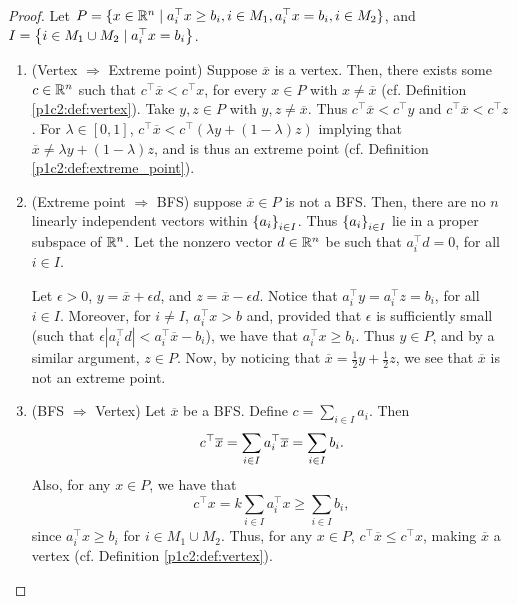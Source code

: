 \begin{proof}
	Let $P =\{ x \in \mathbb{R}^n \mid a_i^\top x \geq b_i, i \in M_1, a_i^\top x = b_i, i \in M_2\}$, and $I = \left\{ i \in M_1 \cup M_2 \mid a_i^\top x = b_i \right \}$.
	
	\begin{enumerate}
		\item (Vertex $\Rightarrow$ Extreme point) Suppose $\overline{x}$ is a vertex. Then, there exists some $c \in \mathbb{R}^n$ such that $c^\top\overline{x} < c^\top x$, for every $x \in P$ with $x \neq \overline{x}$ (cf. Definition \ref{p1c2:def:vertex}). Take $y,z \in P$ with $y,z \neq \overline{x}$. Thus $c^\top\overline{x} < c^\top y$ and $c^\top\overline{x} < c^\top z$. For $\lambda \in [0,1]$, $c^\top \overline{x} < c^\top(\lambda y + (1-\lambda)z)$ implying that $\overline{x} \neq \lambda y + (1-\lambda)z$, and is thus an extreme point (cf. Definition \ref{p1c2:def:extreme_point}).
		
		\item (Extreme point $\Rightarrow$ BFS) suppose $\overline{x} \in P$ is not a BFS. Then, there are no $n$ linearly independent vectors within $\left\{ a_i \right \}_{i \in I}$. Thus $\left\{ a_i \right \}_{i \in I}$ lie in a proper subspace of $\mathbb{R}^n$. Let the nonzero vector $d \in \mathbb{R}^n$ be such that $a_i^\top d = 0$, for all $i \in I$.
			
			Let $\epsilon > 0$, $y = \overline{x} + \epsilon d$, and $z = \overline{x} - \epsilon d$. Notice that $a_i^\top y = a_i^\top z = b_i$, for all $i \in I$. Moreover, for $i \neq I$, $a_i^\top x > b$ and, provided that $\epsilon$ is sufficiently small (such that $\epsilon|a_i^\top d| < a_i ^\top \overline{x} - b_i $), we have that $a_i ^\top x \geq b_i$. Thus $y \in P$, and by a similar argument, $z \in P$. Now, by noticing that $\overline{x} = \frac{1}{2}y + \frac{1}{2}z$, we see that $\overline{x}$ is not an extreme point. 			 
		\item (BFS $\Rightarrow$ Vertex) Let $\overline{x}$ be a BFS. Define $c = \sum_{i \in I} a_i$. Then
			\begin{equation*}
				c^\top \overline{x} = \linebreak \sum_{i \in I} a_i^\top \overline{x} = \sum_{i \in I} b_i.	 			 	
	 		\end{equation*}
			Also, for any $x \in P$, we have that 
			\begin{equation*}
				c^\top x = k \sum_{i \in I} a_i^\top x \geq \sum_{i \in I} b_i, 	 	
	 		\end{equation*}
	 		since $a_i^\top x \geq b_i$ for $i \in M_1 \cup M_2$. Thus, for any $x \in P$, $c^\top \overline{x} \leq c^\top x$, making $\overline{x}$ a vertex (cf. Definition \ref{p1c2:def:vertex}). \qedhere
	\end{enumerate} 	
\end{proof}

